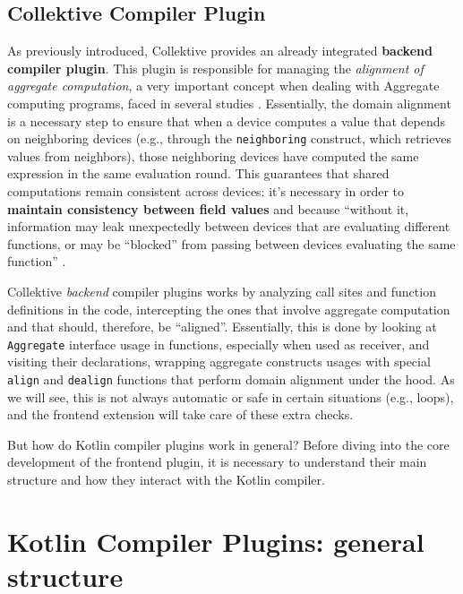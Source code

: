 \documentclass[12pt,a4paper,openright,twoside]{book}
\begin{document}
\subsection{Collektive Compiler Plugin}

As previously introduced, Collektive provides an already integrated
\textbf{backend compiler plugin}. This plugin is responsible for managing the
\emph{alignment of aggregate computation}, a very important concept when dealing
with Aggregate computing programs, faced in several studies
\cite{DBLP:conf/forte/DamianiVPB15} \cite{DBLP:conf/saso/AudritoDVC16}.
%
Essentially, the domain alignment is a necessary step to ensure that when a
device computes a value that depends on neighboring devices (e.g., through the
\lstinline{neighboring} construct, which retrieves values from neighbors), those
neighboring devices have computed the same expression in the same evaluation
round. This guarantees that shared computations remain consistent across
devices: it's necessary in order to \textbf{maintain consistency between field
values} and  because ``without it, information
may leak unexpectedly between devices that are evaluating different functions,
or may be “blocked” from passing between devices evaluating the same function''
\cite{DBLP:conf/forte/DamianiVPB15}.

Collektive \emph{backend} compiler plugins works by analyzing call sites and
function definitions in the code, intercepting the ones that involve aggregate
computation and that should, therefore, be ``aligned''. Essentially, this is
done by looking at \lstinline{Aggregate} interface usage in functions,
especially when used as receiver, and visiting their declarations, wrapping
aggregate constructs usages with special \lstinline{align} and
\lstinline{dealign} functions that perform domain alignment under the hood.
%
As we will see, this is not always automatic or safe in certain situations 
(e.g., loops), and the frontend extension will take care of these extra 
checks. 

But how do Kotlin compiler plugins work in general? Before diving into the 
core development of the frontend plugin, it is necessary to understand their
main structure and how they interact with the Kotlin compiler.

\section{Kotlin Compiler Plugins: general structure} 
\end{document}
